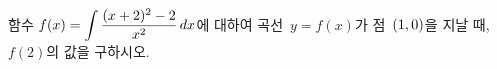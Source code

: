 함수 $f(x)=\displaystyle\int \dfrac{(x+2)^2-2}{x^2}\mkern3mu dx$에 대하여 곡선~$y=f(x)$가 점~$(1{,}\mkern3mu\mathopen{}0)$을 지날 때, $f(2)$의 값을 구하시오.
